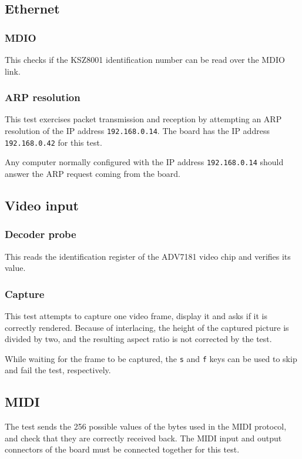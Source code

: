 \documentclass[a4paper,11pt]{article}
\begin{document}
\subsection{Ethernet}
\subsubsection{MDIO}
This checks if the KSZ8001 identification number can be read over the MDIO link.

\subsubsection{ARP resolution}
This test exercises packet transmission and reception by attempting an ARP resolution of the IP address \verb!192.168.0.14!. The board has the IP address \verb!192.168.0.42! for this test.

Any computer normally configured with the IP address \verb!192.168.0.14! should answer the ARP request coming from the board.

\subsection{Video input}
\subsubsection{Decoder probe}
This reads the identification register of the ADV7181 video chip and verifies its value.

\subsubsection{Capture}
This test attempts to capture one video frame, display it and asks if it is correctly rendered. Because of interlacing, the height of the captured picture is divided by two, and the resulting aspect ratio is not corrected by the test.

While waiting for the frame to be captured, the \verb!s! and \verb!f! keys can be used to skip and fail the test, respectively.

\subsection{MIDI}
The test sends the 256 possible values of the bytes used in the MIDI protocol, and check that they are correctly received back. The MIDI input and output connectors of the board must be connected together for this test.
\end{document}
